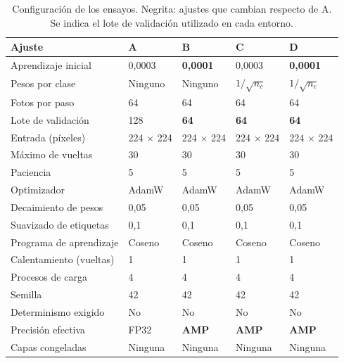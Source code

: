 \begin{table}[H]
\centering
\small
\caption{Configuración de los ensayos. Negrita: ajustes que cambian respecto de A. Se indica el lote de validación utilizado en cada entorno.}
\label{tab:configuration}
\begin{tabularx}{\linewidth}{Y l l l l}
\toprule
\textbf{Ajuste} & \textbf{A} & \textbf{B} & \textbf{C} & \textbf{D}\\
\midrule
Aprendizaje inicial & 0,0003 & \textbf{0,0001} & 0,0003 & \textbf{0,0001}\\
Pesos por clase & Ninguno & Ninguno & \textbf{$1/\sqrt{n_c}$} & \textbf{$1/\sqrt{n_c}$}\\
Fotos por paso & 64 & 64 & 64 & 64\\
Lote de validación & 128 & \textbf{64} & \textbf{64} & \textbf{64}\\
Entrada (píxeles) & 224 $\times$ 224 & 224 $\times$ 224 & 224 $\times$ 224 & 224 $\times$ 224\\
Máximo de vueltas & 30 & 30 & 30 & 30\\
Paciencia & 5 & 5 & 5 & 5\\
Optimizador & AdamW & AdamW & AdamW & AdamW\\
Decaimiento de pesos & 0,05 & 0,05 & 0,05 & 0,05\\
Suavizado de etiquetas & 0,1 & 0,1 & 0,1 & 0,1\\
Programa de aprendizaje & Coseno & Coseno & Coseno & Coseno\\
Calentamiento (vueltas) & 1 & 1 & 1 & 1\\
Procesos de carga & 4 & 4 & 4 & 4\\
Semilla & 42 & 42 & 42 & 42\\
Determinismo exigido & No & No & No & No\\
Precisión efectiva & FP32 & \textbf{AMP} & \textbf{AMP} & \textbf{AMP}\\
Capas congeladas & Ninguna & Ninguna & Ninguna & Ninguna\\
\bottomrule
\end{tabularx}
\end{table}
